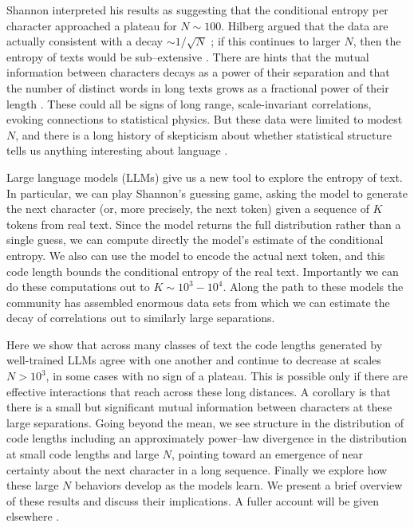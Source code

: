 \documentclass[aps,twocolumn,floats,prx]{revtex4}
\begin{document}
Shannon interpreted his results as suggesting that the conditional entropy per character approached a plateau for $N\sim 100$.  Hilberg argued that the data are actually consistent with a decay $\sim 1/\sqrt{N}$ \cite{Hilberg_1990}; if this continues to larger $N$, then the entropy of texts would be sub--extensive \cite{Ebeling+Nicolis_1992,Debowksi_2011}.  There are hints that the mutual information between characters decays as a power of their separation  and that the number of distinct words in long texts grows as a fractional power of their length \cite{Ebeling+Poschel_1994}.  These could all be signs of long range, scale-invariant correlations, evoking connections to statistical physics.   
But these data were limited to modest $N$, and  there is a long history of skepticism about whether statistical structure tells us anything interesting about language \cite{Chomsky_1956}.

Large language models (LLMs) give us a new tool to explore the entropy of text.  In particular, we can play Shannon's  guessing game, asking the model to generate the next character (or, more precisely, the next token) given a sequence of $K$ tokens from real text.  Since the model returns the full distribution rather than a single guess, we can compute directly the model's estimate of the conditional entropy.  We also can use the model to encode the actual next token, and this code length bounds the conditional entropy of the real text.  Importantly we can do these computations out to $K\sim 10^3 - 10^4$.  Along the path to  these models the community has assembled enormous data sets from which we can estimate the decay of correlations out to similarly large separations.  

Here we show that across many classes of text the code lengths generated by well-trained LLMs agree with one another and continue to decrease at scales $N>  10^3$, in some cases with no sign of a plateau. This is possible only if there are effective interactions that reach across these long distances.  A corollary is that there is a small but significant mutual information between characters at these large separations.  Going beyond the mean,  we see structure in the distribution of code lengths including an approximately power--law divergence in the distribution at small code lengths and large $N$, pointing toward an emergence of near certainty about the next character in a long sequence. Finally we explore how these large $N$ behaviors develop as the models learn.  We present a brief overview of these results  and discuss their implications.  A fuller account will be given elsewhere \cite{SSB2}.
\end{document}
